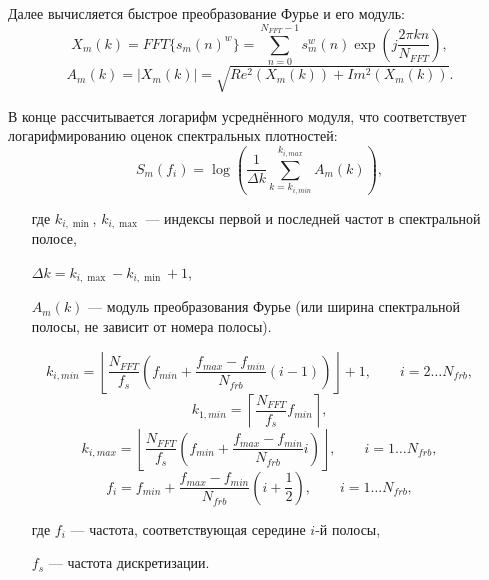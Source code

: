 Далее вычисляется быстрое преобразование Фурье и его модуль:
\begin{equation}
X_m(k) = FFT\{ s_m(n)^w \} = \sum_{n=0}^{N_{FFT} - 1} s_m^{w}(n) \exp{\left(j\frac{2 \pi k n}{N_{FFT}} \right)},
\end{equation}
\begin{equation}
A_m(k) = |X_m(k)| = \sqrt{Re^2(X_m(k)) + Im^2(X_m(k))}.
\end{equation}

В конце рассчитывается логарифм усреднённого модуля, что соответствует логарифмированию оценок спектральных плотностей:
\begin{equation}
S_m(f_i) = \log\left(\frac{1}{\Delta k} \sum_{k=k_{i,min}}^{k_{i,max}} A_m(k)\right),
\end{equation}
\begin{itemize}[align=left,leftmargin=1.8em,itemindent=0pt,labelsep=0pt,labelwidth=1.8em]
	\item[где] $k_{i,\min}$, $k_{i,\max}$ --- индексы первой и последней частот в спектральной полосе,
	\item[] $\Delta k = k_{i,\max} - k_{i,\min} + 1$,
	\item[] $A_m(k)$ --- модуль преобразования Фурье (или ширина спектральной полосы, не зависит от номера полосы).
\end{itemize}

\begin{equation}
k_{i,min} = \left\lfloor\frac{N_{FFT}}{f_s} \left(f_{min} + \frac{f_{max} - f_{min}}{N_{frb}} (i-1) \right)\right\rfloor + 1, \qquad i = 2 \dots N_{frb},
\end{equation}
\begin{equation}
k_{1,min} = \left\lceil\frac{N_{FFT}}{f_s} f_{min} \right\rceil,
\end{equation}
\begin{equation}
k_{i,max} = \left\lfloor\frac{N_{FFT}}{f_s} \left(f_{min} + \frac{f_{max} - f_{min}}{N_{frb}} i \right)\right\rfloor, \qquad i = 1 \dots N_{frb},
\end{equation}
\begin{equation}
f_i = f_{min} + \frac{f_{max} - f_{min}}{N_{frb}} \left(i + \frac{1}{2} \right), \qquad i = 1 \dots N_{frb},
\end{equation}
\begin{itemize}[align=left,leftmargin=1.8em,itemindent=0pt,labelsep=0pt,labelwidth=1.8em]
	\item[где] $f_i$ --- частота, соответствующая середине $i$-й полосы,
	\item[] $f_s$ --- частота дискретизации.
\end{itemize}

